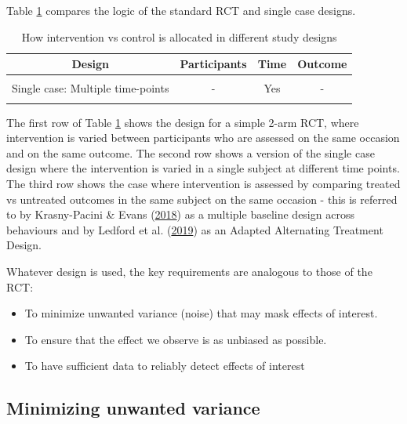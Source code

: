 \documentclass{krantz}
\providecommand{\tightlist}{%
\setlength{\itemsep}{0pt}\setlength{\parskip}{0pt}}
\begin{document}
Table \ref{tab:scdlogic} compares the logic of the standard RCT and single case designs.

\begin{table}

\caption{\label{tab:scdlogic}How intervention vs control is allocated in different study designs}
\centering
\begin{tabular}[t]{cccc}
\toprule
Design & Participants & Time & Outcome\\
\midrule
\cellcolor{gray!6}{RCT: Multiple participants} & \cellcolor{gray!6}{Yes} & \cellcolor{gray!6}{-} & \cellcolor{gray!6}{-}\\
Single case: Multiple time-points & - & Yes & -\\
\cellcolor{gray!6}{Single case: Multiple outcomes} & \cellcolor{gray!6}{-} & \cellcolor{gray!6}{-} & \cellcolor{gray!6}{Yes}\\
\bottomrule
\end{tabular}
\end{table}

The first row of Table \ref{tab:scdlogic} shows the design for a simple 2-arm RCT, where intervention is varied between participants who are assessed on the same occasion and on the same outcome. The second row shows a version of the single case design where the intervention is varied in a single subject at different time points. The third row shows the case where intervention is assessed by comparing treated vs untreated outcomes in the same subject on the same occasion - this is referred to by Krasny-Pacini \& Evans (\protect\hyperlink{ref-krasny-pacini2018}{2018}) as a multiple baseline design across behaviours and by Ledford et al. (\protect\hyperlink{ref-ledford2019}{2019}) as an Adapted Alternating Treatment Design.

Whatever design is used, the key requirements are analogous to those of the RCT:

\begin{itemize}
\tightlist
\item
  To minimize unwanted variance (noise) that may mask effects of interest.
\item
  To ensure that the effect we observe is as unbiased as possible.
\item
  To have sufficient data to reliably detect effects of interest
\end{itemize}

\hypertarget{minimizing-unwanted-variance}{%
\subsection{Minimizing unwanted variance}\label{minimizing-unwanted-variance}}
\end{document}
